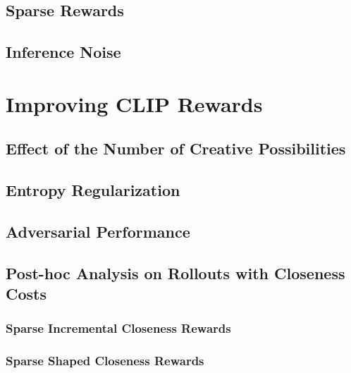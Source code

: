 \subsection{Sparse Rewards} %
\label{sec:sparse-rewards}


\subsection{Inference Noise} %
\label{sec:inference-noise}



\section{Improving CLIP Rewards}
\label{sec:improving-rewards}

\subsection{Effect of the Number of Creative Possibilities}
\label{sec:clip-categories}

\subsection{Entropy Regularization}
\label{sec:entropy-regularization}


\subsection{Adversarial Performance}
\label{sec:adversarial-performance}


\subsection{Post-hoc Analysis on Rollouts with Closeness Costs}
\label{sec:closeness-rollouts}


\subsubsection{Sparse Incremental Closeness Rewards}
\label{sec:sparse-incremental-closeness}


\subsubsection{Sparse Shaped Closeness Rewards}
\label{sec:sparse-shaped-closeness}


